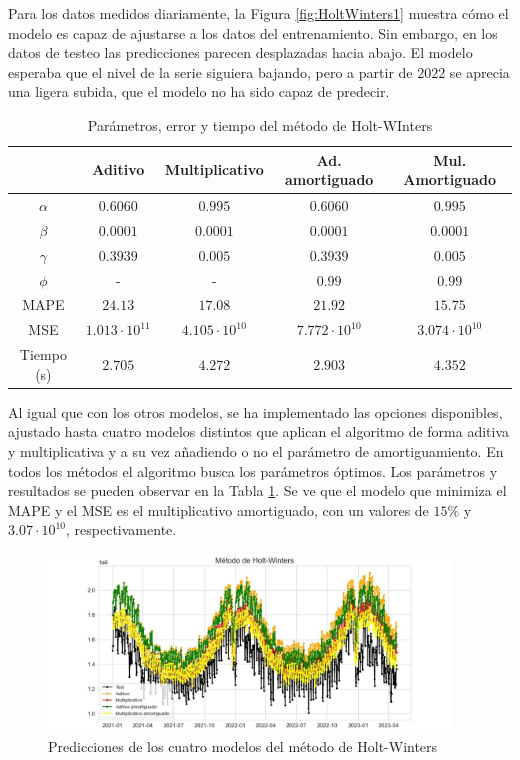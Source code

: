 \documentclass[12pt,twoside]{article}
\begin{document}
Para los datos medidos diariamente, la Figura \ref{fig:HoltWinters1} muestra cómo el modelo es capaz de ajustarse a los datos del entrenamiento. Sin embargo, en los datos de testeo las predicciones parecen desplazadas hacia abajo. El modelo esperaba que el nivel de la serie siguiera bajando, pero a partir de $2022$ se aprecia una ligera subida, que el modelo no ha sido capaz de predecir.
\begin{table}[h] 
\centering
\begin{tabular}{ccccc}  \hline
     & Aditivo & Multiplicativo & Ad. amortiguado & Mul. Amortiguado  \\ \hline
    $\alpha$ &  $0.6060$ &   $0.995$  &  $0.6060$ &   $0.995$ \\ 
    $\beta$  &  $0.0001$ &   $0.0001$ &  $0.0001$ &  $0.0001$ \\ 
    $\gamma$ &  $0.3939$ & 	 $0.005$  &	 $0.3939$ &   $0.005$ \\
    $\phi$   &     -     &       -    &    $0.99$ &    $0.99$ \\ 
      MAPE   &   $24.13$ &   $17.08$ &   $21.92$  &  $15.75$  \\
      MSE & $1.013\cdot10^{11} $&  $4.105\cdot10^{10}$ & $7.772\cdot10^{10}$ & $3.074\cdot10^{10}$\\
      Tiempo (s) & $2.705$ &   $4.272$	 &  $2.903$ & $4.352$\\ \hline
\end{tabular}
\caption{Parámetros, error y tiempo del método de Holt-WInters} \label{tab:holtwinters}
\end{table}


Al igual que con los otros modelos, se ha implementado las opciones disponibles, ajustado hasta cuatro modelos distintos que aplican el algoritmo de forma aditiva y multiplicativa y a su vez añadiendo o no el parámetro de amortiguamiento. En todos los métodos el algoritmo busca los parámetros óptimos. Los parámetros y resultados se pueden observar en la Tabla \ref{tab:holtwinters}. Se ve que el modelo que minimiza el MAPE y el MSE es el multiplicativo  amortiguado, con un valores de $15\%$ y $3.07\cdot10^{10}$, respectivamente.
\begin{figure}[h]
    \centering
    \includegraphics[width = 0.95\textwidth]{imagenes/HoltWinters2.jpg}
    \caption{Predicciones de los cuatro modelos del método de Holt-Winters}\label{fig:HoltWinters2}
\end{figure}
\end{document}
